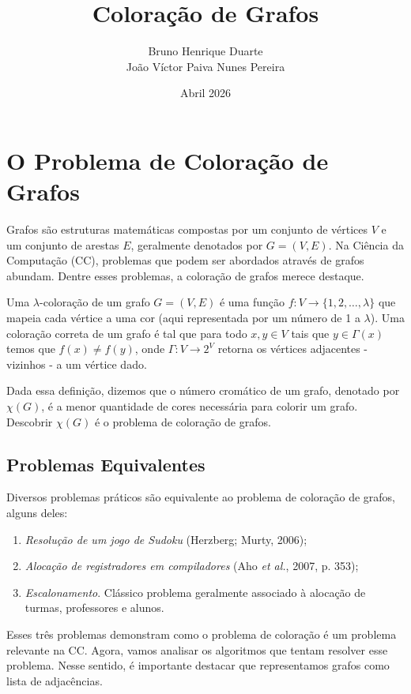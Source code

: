 \documentclass{article}
\title{Coloração de Grafos}
\author{Bruno Henrique Duarte\\João Víctor Paiva Nunes Pereira}
\date{Abril 2026}
\begin{document}
\maketitle

\section{O Problema de Coloração de Grafos}

Grafos são estruturas matemáticas compostas por um conjunto de vértices $V$ e um conjunto de arestas $E$, geralmente denotados por $G=(V,E)$. Na Ciência da Computação (CC), problemas que podem ser abordados através de grafos abundam. Dentre esses problemas, a coloração de grafos merece destaque.

Uma $\lambda$-coloração de um grafo $G=(V,E)$ é uma função $f: V\rightarrow \{1,2,\dots,\lambda\}$ que mapeia cada vértice a uma cor (aqui representada por um número de 1 a $\lambda$). Uma coloração correta de um grafo é tal que para todo $x,y\in V$ tais que $y\in\Gamma(x)$ temos que $f(x)\not=f(y)$, onde $\Gamma: V\rightarrow 2^V$ retorna os vértices adjacentes - vizinhos - a um vértice dado.

Dada essa definição, dizemos que o número cromático de um grafo, denotado por $\chi(G)$, é a menor quantidade de cores necessária para colorir um grafo. Descobrir $\chi(G)$ é o problema de coloração de grafos.

\subsection{Problemas Equivalentes}

Diversos problemas práticos são equivalente ao problema de coloração de grafos, alguns deles:

\begin{enumerate}
	\item \textit{Resolução de um jogo de Sudoku} (Herzberg; Murty, 2006);
	
	\item \textit{Alocação de registradores em compiladores} (Aho \textit{et al.}, 2007, p. 353);
	
	\item \textit{Escalonamento}. Clássico problema geralmente associado à alocação de turmas, professores e alunos.
\end{enumerate}

Esses três problemas demonstram como o problema de coloração é um problema relevante na CC. Agora, vamos analisar os algoritmos que tentam resolver esse problema. Nesse sentido, é importante destacar que representamos grafos como lista de adjacências.
\end{document}
